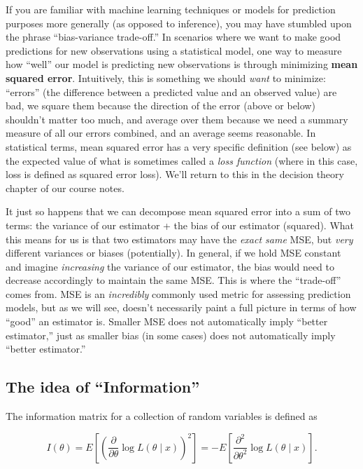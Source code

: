 \documentclass[
  letterpaper,
  DIV=11,
  numbers=noendperiod]{scrreprt}
\begin{document}
If you are familiar with machine learning techniques or models for
prediction purposes more generally (as opposed to inference), you may
have stumbled upon the phrase ``bias-variance trade-off.'' In scenarios
where we want to make good predictions for new observations using a
statistical model, one way to measure how ``well'' our model is
predicting new observations is through minimizing \textbf{mean squared
error}. Intuitively, this is something we should \emph{want} to
minimize: ``errors'' (the difference between a predicted value and an
observed value) are bad, we square them because the direction of the
error (above or below) shouldn't matter too much, and average over them
because we need a summary measure of all our errors combined, and an
average seems reasonable. In statistical terms, mean squared error has a
very specific definition (see below) as the expected value of what is
sometimes called a \emph{loss function} (where in this case, loss is
defined as squared error loss). We'll return to this in the decision
theory chapter of our course notes.

It just so happens that we can decompose mean squared error into a sum
of two terms: the variance of our estimator + the bias of our estimator
(squared). What this means for us is that two estimators may have the
\emph{exact same} MSE, but \emph{very} different variances or biases
(potentially). In general, if we hold MSE constant and imagine
\emph{increasing} the variance of our estimator, the bias would need to
decrease accordingly to maintain the same MSE. This is where the
``trade-off'' comes from. MSE is an \emph{incredibly} commonly used
metric for assessing prediction models, but as we will see, doesn't
necessarily paint a full picture in terms of how ``good'' an estimator
is. Smaller MSE does not automatically imply ``better estimator,'' just
as smaller bias (in some cases) does not automatically imply ``better
estimator.''

\subsection*{The idea of ``Information''}\label{the-idea-of-information}

The information matrix for a collection of random variables is defined
as

\[
I(\theta) = E \left[ \left( \frac{\partial}{\partial \theta} \log L(\theta \mid x) \right)^2\right] = -E\left[ \frac{\partial^2}{\partial \theta^2} \log L(\theta \mid x)\right].
\]
\end{document}
